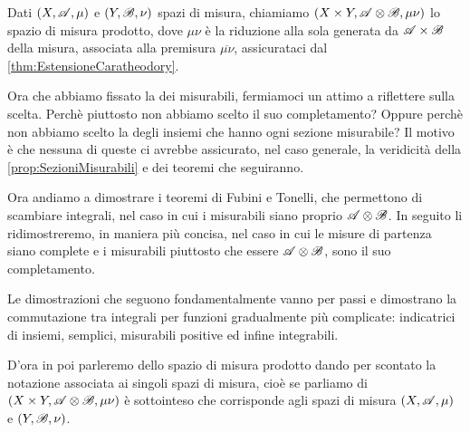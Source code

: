 \begin{definition}\label{def:MisuraProdotto}
	Dati $(X,\mathscr A,\mu)$ e $(Y,\mathscr B,\nu)$ spazi di misura, chiamiamo $(X\times Y,\mathscr A\otimes\mathscr B,\mu\nu)$ lo spazio di misura prodotto, dove $\mu\nu$ è la riduzione alla sola \sigalg{} generata da $\mathscr A\times\mathscr B$ della misura, associata alla premisura $\overline{\mu\nu}$, assicurataci dal \cref{thm:EstensioneCaratheodory}.
\end{definition}

Ora che abbiamo fissato la \sigalg{} dei misurabili, fermiamoci un attimo a riflettere sulla scelta. Perchè piuttosto non abbiamo scelto il suo completamento? Oppure perchè non abbiamo scelto la \sigalg{} degli insiemi che hanno ogni sezione misurabile? 
Il motivo è che nessuna di queste ci avrebbe assicurato, nel caso generale, la veridicità della \cref{prop:SezioniMisurabili} e dei teoremi che seguiranno.

Ora andiamo a dimostrare i teoremi di Fubini e Tonelli, che permettono di scambiare integrali, nel caso in cui i misurabili siano proprio $\mathscr A\otimes\mathscr B$. In seguito li ridimostreremo, in maniera più concisa, nel caso in cui le misure di partenza siano complete e i misurabili piuttosto che essere $\mathscr A\otimes\mathscr B$, sono il suo completamento.

Le dimostrazioni che seguono fondamentalmente vanno per passi e dimostrano la commutazione tra integrali per funzioni gradualmente più complicate: indicatrici di insiemi, semplici, misurabili positive ed infine integrabili.

D'ora in poi parleremo dello spazio di misura prodotto dando per scontato la notazione associata ai singoli spazi di misura, cioè se parliamo di $(X\times Y,\mathscr A\otimes\mathscr B,\mu\nu)$ è sottointeso che corrisponde agli spazi di misura $(X,\mathscr A,\mu)$ e $(Y,\mathscr B,\nu)$.

